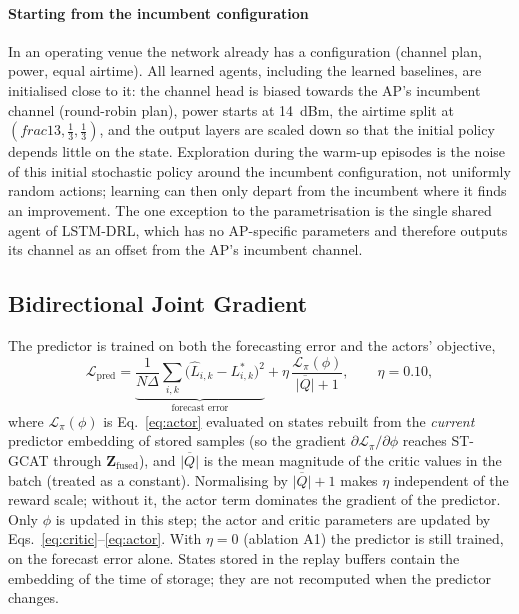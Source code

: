 \paragraph{Starting from the incumbent configuration} In an operating venue the network already has a configuration (channel plan, power, equal airtime). All learned agents, including the learned baselines, are initialised close to it: the channel head is biased towards the AP's incumbent channel (round-robin plan), power starts at 14~dBm, the airtime split at $(	frac13,\tfrac13,\tfrac13)$, and the output layers are scaled down so that the initial policy depends little on the state. Exploration during the warm-up episodes is the noise of this initial stochastic policy around the incumbent configuration, not uniformly random actions; learning can then only depart from the incumbent where it finds an improvement. The one exception to the parametrisation is the single shared agent of LSTM-DRL, which has no AP-specific parameters and therefore outputs its channel as an offset from the AP's incumbent channel.

\subsection{Bidirectional Joint Gradient}
\label{sec:joint}

The predictor is trained on both the forecasting error and the actors' objective,
\begin{equation}
  \mathcal{L}_{\mathrm{pred}}=\underbrace{\frac{1}{N\Delta}\sum_{i,k}\big(\hat L_{i,k}-L^{*}_{i,k}\big)^2}_{\text{forecast error}}+\eta\,\frac{\mathcal{L}_\pi(\phi)}{\overline{|Q|}+1},\qquad\eta=0.10,
  \label{eq:joint}
\end{equation}
where $\mathcal{L}_\pi(\phi)$ is Eq.~\eqref{eq:actor} evaluated on states rebuilt from the \emph{current} predictor embedding of stored samples (so the gradient $\partial\mathcal{L}_\pi/\partial\phi$ reaches ST-GCAT through $\mathbf{Z}_{\mathrm{fused}}$), and $\overline{|Q|}$ is the mean magnitude of the critic values in the batch (treated as a constant). Normalising by $\overline{|Q|}+1$ makes $\eta$ independent of the reward scale; without it, the actor term dominates the gradient of the predictor. Only $\phi$ is updated in this step; the actor and critic parameters are updated by Eqs.~\eqref{eq:critic}--\eqref{eq:actor}. With $\eta=0$ (ablation A1) the predictor is still trained, on the forecast error alone. States stored in the replay buffers contain the embedding of the time of storage; they are not recomputed when the predictor changes.

